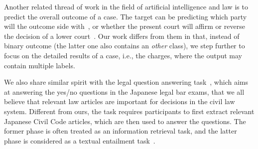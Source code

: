 Another related thread of work in the field of artificial intelligence and law is to predict the overall outcome of a case. The target can be predicting which party will the outcome side with~\cite{aletras2016predicting}, or whether the present court will affirm or reverse the decision of a lower court~\cite{katz2016general}. Our work differs from them in that, instead of binary outcome (the latter one also contains an \emph{other} class), we step further to focus on the detailed results of a case, i.e., the charges, where the output may contain multiple labels. 



We also share similar spirit with the legal question answering task~\cite{COLIEE14}, which aims at answering the yes/no questions in the Japanese legal bar exams, that we all believe that relevant law articles are important for decisions in the civil law system. 
Different from ours, the task requires participants to first extract relevant Japanese Civil Code articles, 
which are then used to answer the questions. 
The former phase is often treated as an information retrieval task, and the latter phase is considered as a textual entailment task~\cite{kim2014legal,kimconvolutional}. 

